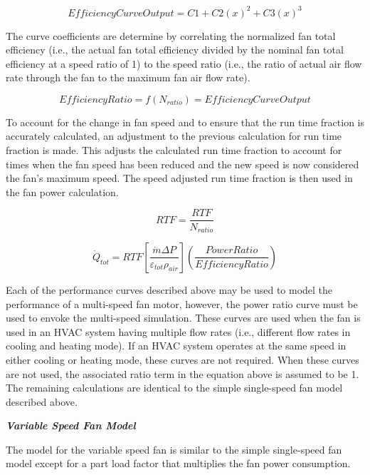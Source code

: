 \begin{equation}
EfficiencyCurveOutput = C1 + C2{\left( x \right)^2} + C3{\left( x \right)^3}
\end{equation}

The curve coefficients are determine by correlating the normalized fan total efficiency (i.e., the actual fan total efficiency divided by the nominal fan total efficiency at a speed ratio of 1) to the speed ratio (i.e., the ratio of actual air flow rate through the fan to the maximum fan air flow rate).

\begin{equation}
EfficiencyRatio = f\left( {{N_{ratio}}} \right) = EfficiencyCurveOutput
\end{equation}

To account for the change in fan speed and to ensure that the run time fraction is accurately calculated, an adjustment to the previous calculation for run time fraction is made. This adjusts the calculated run time fraction to account for times when the fan speed has been reduced and the new speed is now considered the fan's maximum speed. The speed adjusted run time fraction is then used in the fan power calculation.

\begin{equation}
RTF = \frac{RTF}{N_{ratio}}
\end{equation}

\begin{equation}
{\dot{Q}_{tot}} = RTF\left[ {\frac{{\dot{m} \Delta P}}{{{\varepsilon_{tot}}{\rho_{air}}}}} \right]\left( {\frac{{PowerRatio}}{{EfficiencyRatio}}} \right)
\end{equation}

Each of the performance curves described above may be used to model the performance of a multi-speed fan motor, however, the power ratio curve must be used to envoke the multi-speed simulation. These curves are used when the fan is used in an HVAC system having multiple flow rates (i.e., different flow rates in cooling and heating mode). If an HVAC system operates at the same speed in either cooling or heating mode, these curves are not required. When these curves are not used, the associated ratio term in the equation above is assumed to be 1. The remaining calculations are identical to the simple single-speed fan model described above.

\emph{\textbf{Variable Speed Fan Model}}

The model for the variable speed fan is similar to the simple single-speed fan model except for a part load factor that multiplies the fan power consumption.

